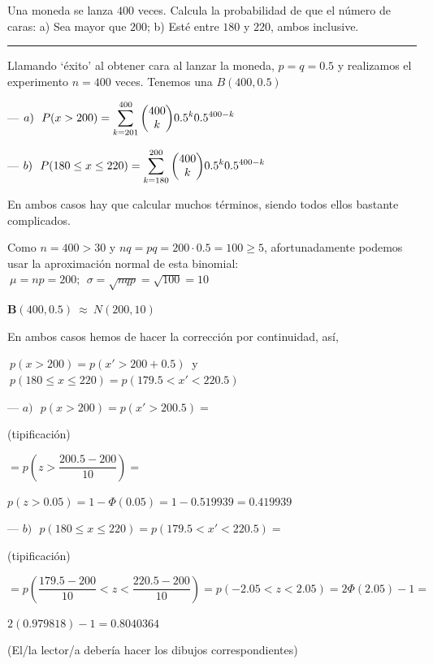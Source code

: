 \vspace{4mm}%
\begin{ejemplo}
\begin{ejre}
Una moneda se lanza $400$ veces. Calcula la probabilidad de que el número de caras:
a) Sea mayor que $200$; b) Esté entre $180$ y $220$, ambos inclusive.

\rule{150pt}{0.1pt}

Llamando `éxito' al obtener cara al lanzar la moneda, $p=q=0.5$ y realizamos el experimento  $n=400$ veces. Tenemos una $B(400,0.5)$

--- $a)\ \ P(x>200)=\displaystyle \sum_{k=201}^{400} \mqty(400\\k) 0.5^k 0.5^{400-k}$

--- $b)\ \ P(180\le x \le 220) =\displaystyle  \sum_{k=180}^{200} \mqty(400\\k) 0.5^k 0.5^{400-k}$

En ambos casos hay que calcular muchos términos, siendo todos ellos bastante complicados.

Como $n=400>30$ y $nq=pq=200\cdot 0.5=100 \ge 5$, afortunadamente podemos usar la aproximación normal de esta binomial: $\ \mu=np=200;\ \ \sigma=\sqrt{nqp}=\sqrt{100}=10$

$\boldsymbol B(400,0.5) \ \approx \ N(200,10)$

En ambos casos hemos de hacer la corrección por continuidad, así, 

$\ p(x>200)=p(x'>200+0.5)\ $ y $\ p(180\le x\le 220)=p(179.5<x'<220.5)$

--- $a)\ \ \ p(x>200)=p(x'>200.5)=$ \begin{footnotesize} \textcolor{gris}{(tipificación)} \end{footnotesize} $=p \left( z>\dfrac{200.5-200}{10} \right) =$

$p(z>0.05)=1-\Phi(0.05)=1-0.519939=0.419939$

--- $b)\ \ \ p(180\le x\le 220)=p(179.5<x'<220.5)=$ \begin{footnotesize} \textcolor{gris}{(tipificación)} \end{footnotesize} 

$=p\left( \dfrac{179.5-200}{10} <z< \dfrac{220.5-200}{10} \right) = p( -2.05 <z< 2.05)= 2\Phi(2.05)-1=$

$2(0.979818)-1=0.8040364$ $\qquad \qquad$  \begin{footnotesize} \textcolor{gris}{(El/la lector/a debería hacer los dibujos correspondientes)} \end{footnotesize} 

\end{ejre}
\end{ejemplo}


